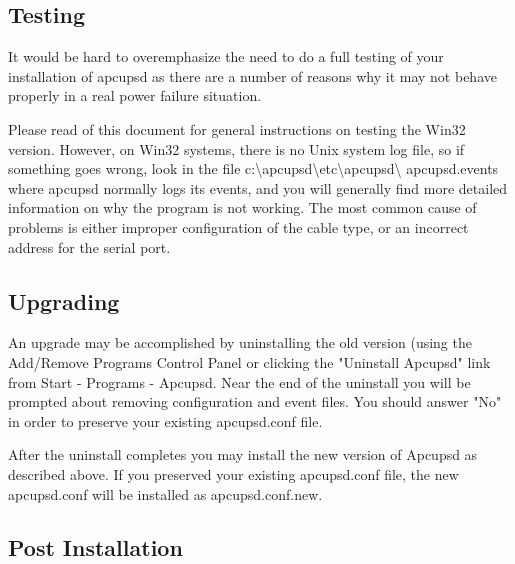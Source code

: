 {{{{{{{\label{Testing}

\subsection*{Testing}

\label{index-Windows_002c-Testing-173}
\label{index-Testing_002c-Windows-174}
It would be hard to overemphasize the need to do a full testing of your
installation of apcupsd as there are a number of reasons why it may not behave
properly in a real power failure situation.  

Please read 
 of this document for
general instructions on testing the Win32 version. However, on Win32 systems,
there is no Unix system log file, so if something goes wrong, look in the file
c:\textbackslash{}apcupsd\textbackslash{}etc\textbackslash{}apcupsd\textbackslash
{}apcupsd.events where apcupsd normally logs its events, and you will
generally find more detailed information on why the program is not working.
The most common cause of problems is either improper configuration of the
cable type, or an incorrect address for the serial port. 

\label{Upgrading}
\subsection*{Upgrading}

An upgrade may be accomplished by uninstalling the old version (using
the Add/Remove Programs Control Panel or clicking the "Uninstall Apcupsd" 
link from Start -\gt{} Programs -\gt{} Apcupsd. Near the end of the
uninstall you will be prompted about removing configuration and event
files. You should answer "No" in order to preserve your existing
apcupsd.conf file.

After the uninstall completes you may install the new version of
Apcupsd as described above. If you preserved your existing apcupsd.conf
file, the new apcupsd.conf will be installed as apcupsd.conf.new.

\label{Post-Installation}
\subsection*{Post Installation}

}}}}}}}
